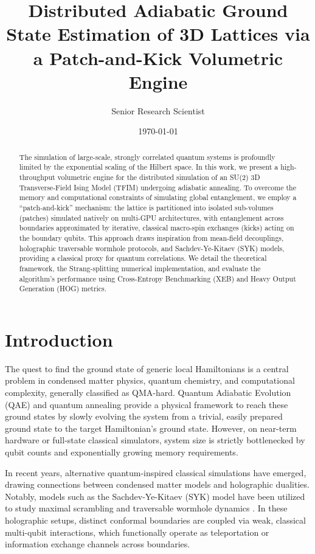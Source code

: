 \documentclass[11pt,a4paper]{article}
\title{Distributed Adiabatic Ground State Estimation of 3D Lattices via a Patch-and-Kick Volumetric Engine}
\author{Senior Research Scientist}
\date{\today}
\begin{document}
\maketitle

\begin{abstract}
The simulation of large-scale, strongly correlated quantum systems is profoundly limited by the exponential scaling of the Hilbert space. In this work, we present a high-throughput volumetric engine for the distributed simulation of an SU(2) 3D Transverse-Field Ising Model (TFIM) undergoing adiabatic annealing. To overcome the memory and computational constraints of simulating global entanglement, we employ a ``patch-and-kick'' mechanism: the lattice is partitioned into isolated sub-volumes (patches) simulated natively on multi-GPU architectures, with entanglement across boundaries approximated by iterative, classical macro-spin exchanges (kicks) acting on the boundary qubits. This approach draws inspiration from mean-field decouplings, holographic traversable wormhole protocols, and Sachdev-Ye-Kitaev (SYK) models, providing a classical proxy for quantum correlations. We detail the theoretical framework, the Strang-splitting numerical implementation, and evaluate the algorithm's performance using Cross-Entropy Benchmarking (XEB) and Heavy Output Generation (HOG) metrics.
\end{abstract}

\section{Introduction}

The quest to find the ground state of generic local Hamiltonians is a central problem in condensed matter physics, quantum chemistry, and computational complexity, generally classified as QMA-hard. Quantum Adiabatic Evolution (QAE) and quantum annealing \cite{farhi2001quantum} provide a physical framework to reach these ground states by slowly evolving the system from a trivial, easily prepared ground state to the target Hamiltonian's ground state. However, on near-term hardware or full-state classical simulators, system size is strictly bottlenecked by qubit counts and exponentially growing memory requirements.

In recent years, alternative quantum-inspired classical simulations have emerged, drawing connections between condensed matter models and holographic dualities. Notably, models such as the Sachdev-Ye-Kitaev (SYK) model have been utilized to study maximal scrambling and traversable wormhole dynamics \cite{maldacena2016remarks, gao2017traversable}. In these holographic setups, distinct conformal boundaries are coupled via weak, classical multi-qubit interactions, which functionally operate as teleportation or information exchange channels across boundaries.
\end{document}

